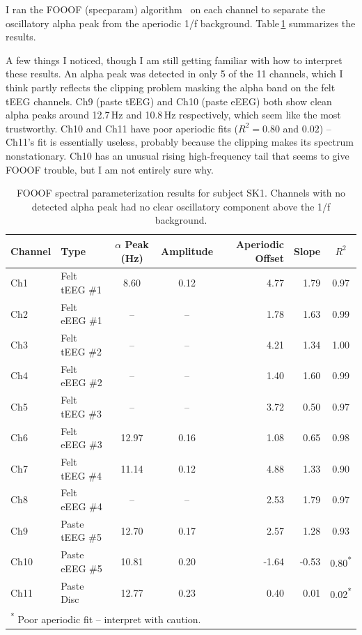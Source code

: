 \documentclass[10pt,conference]{IEEEtran}
\begin{document}
I ran the FOOOF (specparam) algorithm~\cite{donoghue2020} on each channel to separate the
oscillatory alpha peak from the aperiodic 1/f background.
Table\,\ref{tab:fooof} summarizes the results.

A few things I noticed, though I am still getting familiar with how to
interpret these results.
An alpha peak was detected in only 5 of the 11 channels, which I think
partly reflects the clipping problem masking the alpha band on the felt tEEG
channels.
Ch9 (paste tEEG) and Ch10 (paste eEEG) both show clean alpha peaks around
12.7\,Hz and 10.8\,Hz respectively, which seem like the most trustworthy.
Ch10 and Ch11 have poor aperiodic fits ($R^{2} = 0.80$ and $0.02$) --
Ch11's fit is essentially useless, probably because the clipping makes its
spectrum nonstationary. Ch10 has an unusual rising high-frequency tail
that seems to give FOOOF trouble, but I am not entirely sure why.

\begin{table}[t]
  \centering
  \caption{FOOOF spectral parameterization results for subject SK1.
    Channels with no detected alpha peak had no clear oscillatory
    component above the 1/f background.}
  \label{tab:fooof}
  \renewcommand{\arraystretch}{1.2}
  \begin{tabular}{llccrrc}
    \toprule
    \textbf{Channel} & \textbf{Type} &
    \textbf{$\alpha$ Peak (Hz)} & \textbf{Amplitude} &
    \textbf{Aperiodic Offset} & \textbf{Slope} &
    \textbf{$R^{2}$} \\
    \midrule
    Ch1  & Felt tEEG \#1  &  8.60 & 0.12 &  4.77 &  1.79 & 0.97 \\
    Ch2  & Felt eEEG \#1  & --    & --   &  1.78 &  1.63 & 0.99 \\
    Ch3  & Felt tEEG \#2  & --    & --   &  4.21 &  1.34 & 1.00 \\
    Ch4  & Felt eEEG \#2  & --    & --   &  1.40 &  1.60 & 0.99 \\
    Ch5  & Felt tEEG \#3  & --    & --   &  3.72 &  0.50 & 0.97 \\
    Ch6  & Felt eEEG \#3  & 12.97 & 0.16 &  1.08 &  0.65 & 0.98 \\
    Ch7  & Felt tEEG \#4  & 11.14 & 0.12 &  4.88 &  1.33 & 0.90 \\
    Ch8  & Felt eEEG \#4  & --    & --   &  2.53 &  1.79 & 0.97 \\
    Ch9  & Paste tEEG \#5 & 12.70 & 0.17 &  2.57 &  1.28 & 0.93 \\
    Ch10 & Paste eEEG \#5 & 10.81 & 0.20 & -1.64 & -0.53 & 0.80\textsuperscript{*} \\
    Ch11 & Paste Disc     & 12.77 & 0.23 &  0.40 &  0.01 & 0.02\textsuperscript{*} \\
    \bottomrule
    \multicolumn{7}{l}{\small \textsuperscript{*} Poor aperiodic fit -- interpret with caution.}
  \end{tabular}
\end{table}
\end{document}
